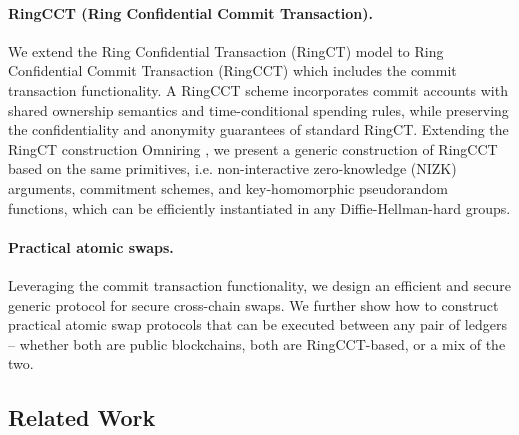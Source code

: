 \paragraph*{RingCCT (Ring Confidential Commit Transaction).} We extend the Ring Confidential Transaction (RingCT) model to Ring Confidential Commit Transaction (RingCCT) which includes the commit transaction functionality. A RingCCT scheme incorporates commit accounts with shared ownership semantics and time-conditional spending rules, while preserving the confidentiality and anonymity guarantees of standard RingCT. Extending the RingCT construction Omniring \cite{...}, we present a generic construction of RingCCT based on the same primitives, i.e. non-interactive zero-knowledge (NIZK) arguments, commitment schemes, and key-homomorphic pseudorandom functions, which can be efficiently instantiated in any Diffie-Hellman-hard groups. 

\paragraph*{Practical atomic swaps.} 
Leveraging the commit transaction functionality, we design an efficient and secure generic protocol for secure cross-chain swaps. We further show how to construct practical atomic swap protocols that can be executed between any pair of ledgers -- whether both are public blockchains, both are RingCCT-based, or a mix of the two.


\subsection{Related Work}
